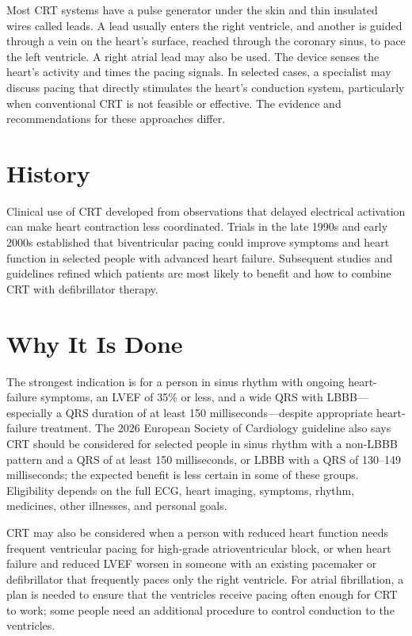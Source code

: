 Most CRT systems have a pulse generator under the skin and thin insulated wires called leads. A lead usually enters the right ventricle, and another is guided through a vein on the heart's surface, reached through the coronary sinus, to pace the left ventricle. A right atrial lead may also be used. The device senses the heart's activity and times the pacing signals. In selected cases, a specialist may discuss pacing that directly stimulates the heart's conduction system, particularly when conventional CRT is not feasible or effective. The evidence and recommendations for these approaches differ.

\section*{History}
Clinical use of CRT developed from observations that delayed electrical activation can make heart contraction less coordinated. Trials in the late 1990s and early 2000s established that biventricular pacing could improve symptoms and heart function in selected people with advanced heart failure. Subsequent studies and guidelines refined which patients are most likely to benefit and how to combine CRT with defibrillator therapy.

\section*{Why It Is Done}
The strongest indication is for a person in sinus rhythm with ongoing heart-failure symptoms, an LVEF of 35\% or less, and a wide QRS with LBBB—especially a QRS duration of at least 150 milliseconds—despite appropriate heart-failure treatment. The 2026 European Society of Cardiology guideline also says CRT should be considered for selected people in sinus rhythm with a non-LBBB pattern and a QRS of at least 150 milliseconds, or LBBB with a QRS of 130--149 milliseconds; the expected benefit is less certain in some of these groups. Eligibility depends on the full ECG, heart imaging, symptoms, rhythm, medicines, other illnesses, and personal goals.

CRT may also be considered when a person with reduced heart function needs frequent ventricular pacing for high-grade atrioventricular block, or when heart failure and reduced LVEF worsen in someone with an existing pacemaker or defibrillator that frequently paces only the right ventricle. For atrial fibrillation, a plan is needed to ensure that the ventricles receive pacing often enough for CRT to work; some people need an additional procedure to control conduction to the ventricles.

